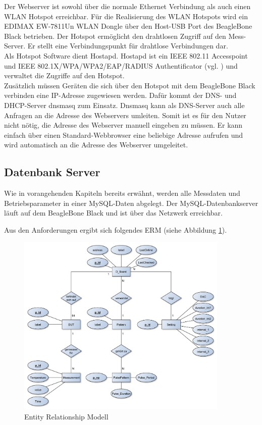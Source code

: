 Der Webserver ist sowohl über die normale Ethernet Verbindung als auch einen WLAN Hotspot erreichbar. Für die Realisierung des WLAN Hotspots wird ein EDIMAX EW-7811Un WLAN Dongle über den Host-USB Port des BeagleBone Black betrieben. Der Hotspot ermöglicht den drahtlosen Zugriff auf den Mess-Server. Er stellt eine Verbindungspunkt für drahtlose Verbindungen dar.\\
Als Hotspot Software dient Hostapd. Hostapd ist ein IEEE 802.11 Accesspoint und IEEE 802.1X/WPA/WPA2/EAP/RADIUS Authentificator (vgl. \cite{LinuxWireless}) und verwaltet die Zugriffe auf den Hotspot.\\
Zusätzlich müssen Geräten die sich über den Hotspot mit dem BeagleBone Black verbinden eine IP-Adresse zugewiesen werden. Dafür kommt der DNS- und DHCP-Server dnsmasq zum Einsatz. Dnsmasq kann als DNS-Server auch alle Anfragen an die Adresse des Webservers umleiten. Somit ist es für den Nutzer nicht nötig, die Adresse des Webserver manuell eingeben zu müssen. Er kann einfach über einen Standard-Webbrowser eine beliebige Adresse aufrufen und wird automatisch an die Adresse des Webserver umgeleitet.\\




\newpage

\subsection{Datenbank Server}
\label{section_EntwurfDatenbank}

Wie in vorangehenden Kapiteln bereits erwähnt, werden alle Messdaten und Betriebsparameter in einer MySQL-Daten abgelegt. Der MySQL-Datenbankserver läuft auf dem BeagleBone Black und ist über das Netzwerk erreichbar.

Aus den Anforderungen ergibt sich folgendes \ac{ERM} (siehe Abbildung \ref{ERM}). \\

\begin{figure}[H]
\begin{center}
\includegraphics[width=0.9\textwidth]{img/general/ER_Diagramm.pdf}
\caption{Entity Relationship Modell}
\label{ERM}
\end{center}
\end{figure}

